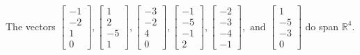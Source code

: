 \begin{exercise}
\begin{exerciseStatement}
  \end{exerciseStatement}
  \begin{exerciseAnswer}
   The vectors \(\left[\begin{array}{r}
-1 \\
-2 \\
1 \\
0
\end{array}\right] , \left[\begin{array}{r}
1 \\
2 \\
-5 \\
1
\end{array}\right] , \left[\begin{array}{r}
-3 \\
-2 \\
4 \\
0
\end{array}\right] , \left[\begin{array}{r}
-1 \\
-5 \\
-1 \\
2
\end{array}\right] , \left[\begin{array}{r}
-2 \\
-3 \\
-4 \\
-1
\end{array}\right] , \text{ and } \left[\begin{array}{r}
1 \\
-5 \\
-3 \\
0
\end{array}\right]\) 
  	 do  
	span \(\mathbb{R}^4\).
  


  \end{exerciseAnswer}
\end{exercise}